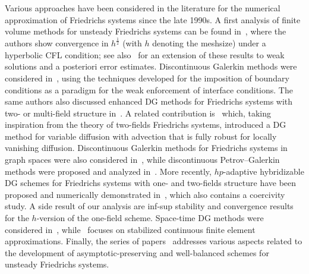 \documentclass[11pt,a4paper]{article}
\theoremstyle{plain}
\theoremstyle{remark}
\theoremstyle{definition}
\begin{document}
Various approaches have been considered in the literature for the numerical approximation of Friedrichs systems since the late 1990s.
A first analysis of finite volume methods for unsteady Friedrichs systems can be found in~\cite{Vila.Villedieu:97}, where the authors show convergence in $h^{\frac12}$ (with $h$ denoting the meshsize) under a hyperbolic CFL condition; see also~\cite{Jovanovic.Rohde:05} for an extension of these results to weak solutions and a posteriori error estimates.
Discontinuous Galerkin methods were considered in~\cite{Ern.Guermond:06}, using the techniques developed for the imposition of boundary conditions as a paradigm for the weak enforcement of interface conditions.
The same authors also discussed enhanced DG methods for Friedrichs systems with two- or multi-field structure in~\cite{Ern.Guermond:06*1,Ern.Guermond:08}.
A related contribution is~\cite{Di-Pietro.Ern.ea:08} which, taking inspiration from the theory of two-fields Friedrichs systems, introduced a DG method for variable diffusion with advection that is fully robust for locally vanishing diffusion.
Discontinuous Galerkin methods for Friedrichs systems in graph spaces were also considered in~\cite{Jensen:06}, while %
discontinuous Petrov--Galerkin methods were proposed and analyzed in~\cite{Bui-Thanh.Demkowicz.ea:13}.
More recently, $hp$-adaptive hybridizable DG schemes for Friedrichs systems with one- and two-fields structure have been proposed and numerically demonstrated in~\cite{Chen.Kang.ea:24}, which also contains a coercivity study.
A side result of our analysis are inf-sup stability and convergence results for the $h$-version of the one-field scheme.
Space-time DG methods were considered in~\cite{Corallo.Dorfler.ea:23}, while~\cite{Burman.Ern:07} focuses on stabilized continuous finite element approximations.
Finally, the series of papers~\cite{Buet.Despres.ea:15,Despres.Buet:16,Morel.Buet.ea:18} addresses various aspects related to the development of asymptotic-preserving and well-balanced schemes for unsteady Friedrichs systems.
\smallskip
\end{document}
